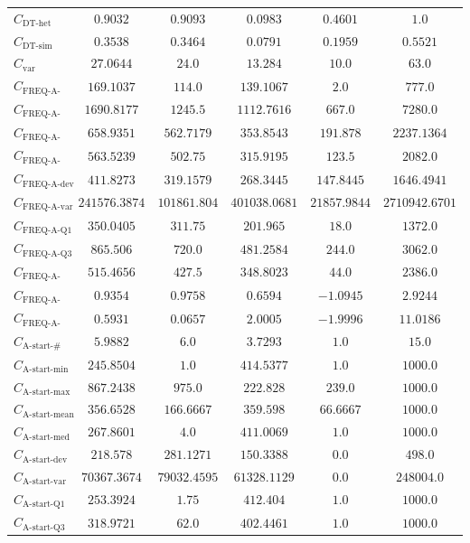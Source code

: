 \documentclass{standalone}
\newcommand{\varietyname}{\text{var}}
\newcommand{\variety}{C_{\varietyname}}
\newcommand{\startactivitiesname}{\text{A-start-\#}}
\newcommand{\startactivities}{C_{\startactivitiesname}}
\newcommand{\startminname}{\text{A-start-min}}
\newcommand{\startmin}{C_{\startminname}}
\newcommand{\startmaxname}{\text{A-start-max}}
\newcommand{\startmax}{C_{\startmaxname}}
\newcommand{\startmeanname}{\text{A-start-mean}}
\newcommand{\startmean}{C_{\startmeanname}}
\newcommand{\startmedianname}{\text{A-start-med}}
\newcommand{\startmedian}{C_{\startmedianname}}
\newcommand{\startdevname}{\text{A-start-dev}}
\newcommand{\startdev}{C_{\startdevname}}
\newcommand{\startvarname}{\text{A-start-var}}
\newcommand{\startvar}{C_{\startvarname}}
\newcommand{\startqonename}{\text{A-start-Q1}}
\newcommand{\startqone}{C_{\startqonename}}
\newcommand{\startqthreename}{\text{A-start-Q3}}
\newcommand{\startqthree}{C_{\startqthreename}}
\newcommand{\actfreqminname}{\text{FREQ-A-min}}
\newcommand{\actfreqmin}{C_{\actfreqminname}}
\newcommand{\actfreqmaxname}{\text{FREQ-A-max}}
\newcommand{\actfreqmax}{C_{\actfreqmaxname}}
\newcommand{\actfreqmeanname}{\text{FREQ-A-mean}}
\newcommand{\actfreqmean}{C_{\actfreqmeanname}}
\newcommand{\actfreqmedianname}{\text{FREQ-A-med}}
\newcommand{\actfreqmedian}{C_{\actfreqmedianname}}
\newcommand{\actfreqdevname}{\text{FREQ-A-dev}}
\newcommand{\actfreqdev}{C_{\actfreqdevname}}
\newcommand{\actfreqvarname}{\text{FREQ-A-var}}
\newcommand{\actfreqvar}{C_{\actfreqvarname}}
\newcommand{\actfreqqonename}{\text{FREQ-A-Q1}}
\newcommand{\actfreqqone}{C_{\actfreqqonename}}
\newcommand{\actfreqqthreename}{\text{FREQ-A-Q3}}
\newcommand{\actfreqqthree}{C_{\actfreqqthreename}}
\newcommand{\actfreqiqrname}{\text{FREQ-A-IRQ}}
\newcommand{\actfreqiqr}{C_{\actfreqiqrname}}
\newcommand{\actfreqskewname}{\text{FREQ-A-skew}}
\newcommand{\actfreqskew}{C_{\actfreqskewname}}
\newcommand{\actfreqkurtname}{\text{FREQ-A-kurt}}
\newcommand{\actfreqkurt}{C_{\actfreqkurtname}}
\newcommand{\dthetname}{\text{DT-het}}
\newcommand{\dthet}{C_{\dthetname}}
\newcommand{\dtsimname}{\text{DT-sim}}
\newcommand{\dtsim}{C_{\dtsimname}}
\begin{document}
\begin{tabular}{lccccc}
$\dthet$ & $0.9032$ & $0.9093$ & $0.0983$ & $0.4601$ & $1.0$ \\ 
$\dtsim$ & $0.3538$ & $0.3464$ & $0.0791$ & $0.1959$ & $0.5521$ \\ 
$\variety$ & $27.0644$ & $24.0$ & $13.284$ & $10.0$ & $63.0$ \\ 
$\actfreqmin$ & $169.1037$ & $114.0$ & $139.1067$ & $2.0$ & $777.0$ \\ 
$\actfreqmax$ & $1690.8177$ & $1245.5$ & $1112.7616$ & $667.0$ & $7280.0$ \\ 
$\actfreqmean$ & $658.9351$ & $562.7179$ & $353.8543$ & $191.878$ & $2237.1364$ \\ 
$\actfreqmedian$ & $563.5239$ & $502.75$ & $315.9195$ & $123.5$ & $2082.0$ \\ 
$\actfreqdev$ & $411.8273$ & $319.1579$ & $268.3445$ & $147.8445$ & $1646.4941$ \\ 
$\actfreqvar$ & $241576.3874$ & $101861.804$ & $401038.0681$ & $21857.9844$ & $2710942.6701$ \\ 
$\actfreqqone$ & $350.0405$ & $311.75$ & $201.965$ & $18.0$ & $1372.0$ \\ 
$\actfreqqthree$ & $865.506$ & $720.0$ & $481.2584$ & $244.0$ & $3062.0$ \\ 
$\actfreqiqr$ & $515.4656$ & $427.5$ & $348.8023$ & $44.0$ & $2386.0$ \\ 
$\actfreqskew$ & $0.9354$ & $0.9758$ & $0.6594$ & $-1.0945$ & $2.9244$ \\ 
$\actfreqkurt$ & $0.5931$ & $0.0657$ & $2.0005$ & $-1.9996$ & $11.0186$ \\ 
$\startactivities$ & $5.9882$ & $6.0$ & $3.7293$ & $1.0$ & $15.0$ \\ 
$\startmin$ & $245.8504$ & $1.0$ & $414.5377$ & $1.0$ & $1000.0$ \\ 
$\startmax$ & $867.2438$ & $975.0$ & $222.828$ & $239.0$ & $1000.0$ \\ 
$\startmean$ & $356.6528$ & $166.6667$ & $359.598$ & $66.6667$ & $1000.0$ \\ 
$\startmedian$ & $267.8601$ & $4.0$ & $411.0069$ & $1.0$ & $1000.0$ \\ 
$\startdev$ & $218.578$ & $281.1271$ & $150.3388$ & $0.0$ & $498.0$ \\ 
$\startvar$ & $70367.3674$ & $79032.4595$ & $61328.1129$ & $0.0$ & $248004.0$ \\ 
$\startqone$ & $253.3924$ & $1.75$ & $412.404$ & $1.0$ & $1000.0$ \\ 
$\startqthree$ & $318.9721$ & $62.0$ & $402.4461$ & $1.0$ & $1000.0$ \\ 

\end{tabular}
\end{document}
